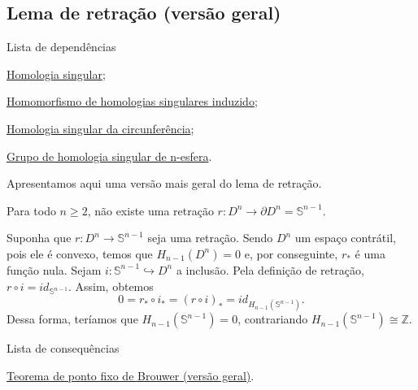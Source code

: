 \subsection{Lema de retração (versão geral)} %
\label{lema-de-retracao-geral-prop}
\begin{titlemize}{Lista de dependências}
    \item \hyperref[homologia-singular-def]{Homologia singular};\\
    \item \hyperref[homomorfismo-de-homologias-singulares-induzido-prop]{Homomorfismo de homologias singulares induzido};\\
    \item \hyperref[homologia-singular-de-S1-prop]{Homologia singular da circunferência};\\
    \item \hyperref[grupo-de-homologia-singular-de-n-esfera-prop]{Grupo de homologia singular de n-esfera}.
\end{titlemize}

Apresentamos aqui uma versão mais geral do lema de retração.

\begin{lemma}
	Para todo $n\ge 2$, não existe uma retração $r:D^n \longrightarrow \partial D^n = \mathbb{S}^{n-1}$.
\end{lemma}

\begin{dem}
Suponha que $r:D^{n} \longrightarrow \mathbb{S}^{n-1}$ seja uma retração. Sendo $D^n$ um espaço contrátil, pois ele é convexo, temos que $H_{n-1}(D^n)=0$ e, por conseguinte, $r_*$ é uma função nula. Sejam $i:\mathbb{S}^{n-1}\hookrightarrow D^n$ a inclusão. Pela definição de retração, $r\circ i=id_{\mathbb{S}^{n-1}}$. Assim, obtemos 
\[0=r_*\circ i_*=(r\circ i)_*=id_{H_{n-1}(\mathbb{S}^{n-1})}.\]
Dessa forma, teríamos que $H_{n-1}(\mathbb{S}^{n-1})=0$, contrariando $H_{n-1}(\mathbb{S}^{n-1})\cong \mathbb{Z}$.
\end{dem}

\begin{titlemize}{Lista de consequências}
    \item \hyperref[teorema-de-ponto-fixo-de-brouwer-geral-prop]{Teorema de ponto fixo de Brouwer (versão geral)}.
\end{titlemize}
